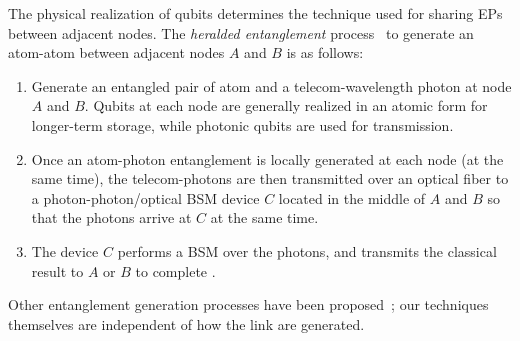 The physical realization of qubits 
determines the technique used for sharing EPs between adjacent nodes. 
The \emph{heralded entanglement} process~\cite{sigcomm20, caleffi} to 
generate an atom-atom \eps between adjacent nodes $A$ and $B$
is as follows:
\begin{enumerate}
    \item 
Generate an entangled pair of atom and a telecom-wavelength photon at node $A$
and $B$.  
Qubits at each node are generally realized in an atomic form
for longer-term storage, while photonic qubits are used for transmission.

\item 
Once an atom-photon entanglement is locally generated
at each node (at the same time), 
the telecom-photons are then transmitted over an optical fiber to a photon-photon/optical BSM device $C$ located in the middle of 
$A$ and $B$ so that the photons arrive at $C$ 
at the same time.

\item 
The device $C$ performs a BSM over the photons, 
and transmits the classical result to $A$ or $B$ to complete \es.
\end{enumerate}
Other entanglement generation processes have been 
proposed~\cite{muralidharan2016optimal}; %
our techniques themselves are independent of how the link \eps are generated.













